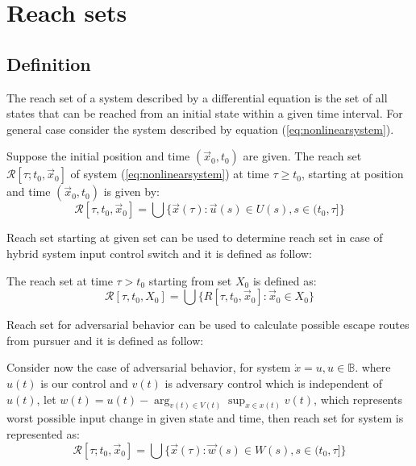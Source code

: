 \section{Reach sets}

\subsection*{Definition}
\noindent
The reach set of a system described by a differential equation is the
set of all states that can be reached from an initial state within a given time
interval.
\noindent For general case consider the system described by equation (\ref{eq:nonlinearsystem}).

\begin{definition}\label{def:reachset01}
Suppose the initial position
and time $(\vec{x}_0, t_0)$ are given. The reach set $\mathscr{R}[\tau; t_0, \vec{x}_0]$ of system (\ref{eq:nonlinearsystem}) at time $\tau \ge t_0$, starting at position and time $(\vec{x}_0, t_0)$ is given by:
\begin{equation}
    \mathscr{R}[\tau, t_0, \vec{x}_0] = \bigcup \{\vec{x}(\tau):\vec{u}(s)\in U(s),s \in (t_0,\tau]\}
\end{equation}
\end{definition}
\noindent Reach set starting at given set can be used to determine reach set in case of hybrid system input control switch and it is defined as follow:
\begin{definition}
The reach set at time $\tau > t_0$ starting from set $X_0$ is defined as:
\begin{equation}
    \mathscr{R}[\tau, t_0, X_0] = \bigcup \{R[\tau, t_0, \vec{x}_0]:\vec{x}_0 \in X_0\}
\end{equation}
\end{definition}

\newpage\noindent Reach set for adversarial behavior can be used to calculate possible escape routes from pursuer and it is defined as follow:
\begin{definition}
Consider now the case of adversarial behavior, for system $\dot{x}=u,u\in \mathbb{B}$.
where $u(t)$ is our control and $v(t)$ is adversary control which is independent of $u(t)$, let $w(t)=u(t)- \arg_{v(t)\in V(t)}\sup_{{x} \in x(t)} v(t)$, which represents worst possible input change in given state and time, then reach set for system is represented as:
\begin{equation}
    \mathscr{R}[\tau; t_0, \vec{x}_0] = \bigcup \{\vec{x}(\tau):\vec{w}(s) \in W(s),s \in (t_0,\tau]\}
\end{equation}

\end{definition}

